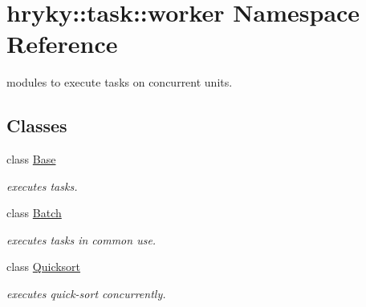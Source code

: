 \hypertarget{namespacehryky_1_1task_1_1worker}{\section{hryky\-:\-:task\-:\-:worker Namespace Reference}
\label{namespacehryky_1_1task_1_1worker}
}


modules to execute tasks on concurrent units.  


\subsection*{Classes}
\begin{DoxyCompactItemize}
\item 
class \hyperlink{classhryky_1_1task_1_1worker_1_1_base}{Base}
\begin{DoxyCompactList}\small\item\em executes tasks. \end{DoxyCompactList}\item 
class \hyperlink{classhryky_1_1task_1_1worker_1_1_batch}{Batch}
\begin{DoxyCompactList}\small\item\em executes tasks in common use. \end{DoxyCompactList}\item 
class \hyperlink{classhryky_1_1task_1_1worker_1_1_quicksort}{Quicksort}
\begin{DoxyCompactList}\small\item\em executes quick-\/sort concurrently. \end{DoxyCompactList}\end{DoxyCompactItemize}
